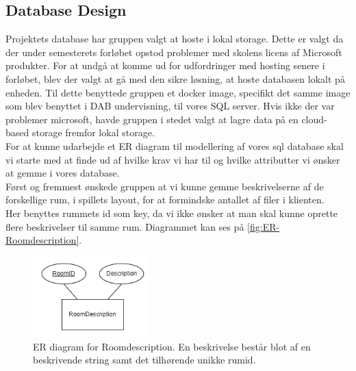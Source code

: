 \subsection{Database Design}
\label{ssec:DB Design}

Projektets database har gruppen valgt at hoste i lokal storage. Dette er valgt da der under semesterets forløbet opstod problemer med skolens licens af Microsoft produkter. For at undgå at komme ud for udfordringer med hosting senere i forløbet, blev der valgt at gå med den sikre løsning, at hoste databasen lokalt på enheden. Til dette benyttede gruppen et docker image\cite{SQL-server-with-docker}, specifikt det samme image som blev benyttet i DAB undervisning, til vores SQL server.
Hvis ikke der var problemer microsoft, havde gruppen i stedet valgt at lagre data på en cloud-based storage fremfor lokal storage.\\

\noindent For at kunne udarbejde et ER diagram til modellering af vores sql database skal vi starte med at finde ud af hvilke krav vi har til og hvilke attributter vi ønsker at gemme i vores database.\\
Først og fremmest ønskede gruppen at vi kunne gemme beskrivelserne af de forskellige rum, i spillets layout, for at formindske antallet af filer i klienten.\\ 
Her benyttes rummets id som key, da vi ikke ønsker at man skal kunne oprette flere beskrivelser til samme rum. Diagrammet kan ses på \autoref{fig:ER-Roomdescription}.

\begin{figure}[H]
\centering
\includegraphics[width = 0.4\textwidth]{02-Body/Images/ER-RoomDescription.PNG}
\caption{ER diagram for Roomdescription. En beskrivelse består blot af en beskrivende string samt det tilhørende unikke rumid.}
\label{fig:ER-Roomdescription}
\end{figure}

